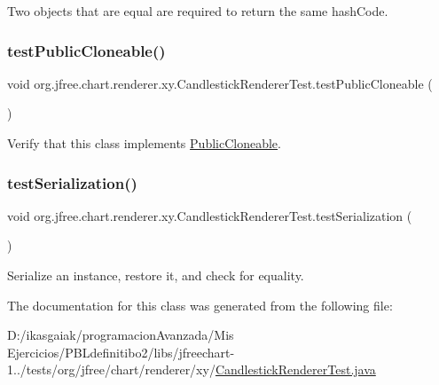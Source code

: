 Two objects that are equal are required to return the same hash\+Code. \mbox{\label{classorg_1_1jfree_1_1chart_1_1renderer_1_1xy_1_1_candlestick_renderer_test_a7dfb128cd8f2fb4dbf9195b32a323e03}} 
\subsubsection{\texorpdfstring{test\+Public\+Cloneable()}{testPublicCloneable()}}
{\footnotesize\ttfamily void org.\+jfree.\+chart.\+renderer.\+xy.\+Candlestick\+Renderer\+Test.\+test\+Public\+Cloneable (\begin{DoxyParamCaption}{ }\end{DoxyParamCaption})}

Verify that this class implements \mbox{\hyperlink{}{Public\+Cloneable}}. \mbox{\label{classorg_1_1jfree_1_1chart_1_1renderer_1_1xy_1_1_candlestick_renderer_test_ad2afc2d403234f0bf3d6d082fcf74b00}} 
\subsubsection{\texorpdfstring{test\+Serialization()}{testSerialization()}}
{\footnotesize\ttfamily void org.\+jfree.\+chart.\+renderer.\+xy.\+Candlestick\+Renderer\+Test.\+test\+Serialization (\begin{DoxyParamCaption}{ }\end{DoxyParamCaption})}

Serialize an instance, restore it, and check for equality. 

The documentation for this class was generated from the following file\+:\begin{DoxyCompactItemize}
\item 
D\+:/ikasgaiak/programacion\+Avanzada/\+Mis Ejercicios/\+P\+B\+Ldefinitibo2/libs/jfreechart-\/1../tests/org/jfree/chart/renderer/xy/\mbox{\hyperlink{_candlestick_renderer_test_8java}{Candlestick\+Renderer\+Test.\+java}}\end{DoxyCompactItemize}
